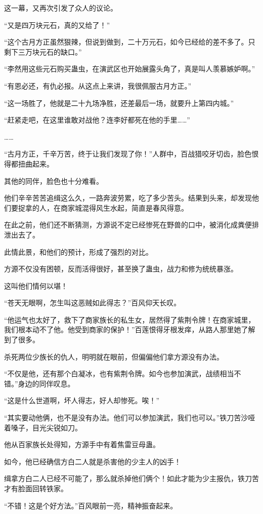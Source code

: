\begin{this_body}
这一幕，又再次引发了众人的议论。

“又是四万块元石，真的又给了！”

“这个古月方正虽然狠辣，但说到做到，二十万元石，如今已经给的差不多了。只剩下三万块元石的缺口。”

“李然用这些元石购买蛊虫，在演武区也开始展露头角了，真是叫人羡慕嫉妒啊。”

“有恩必还，有仇必报。从这点上来讲，我很佩服古月方正。”

“这一场胜了，他就是二十九场净胜，还差最后一场，就要升上第四内城。”

“赶紧走吧，在这里谁敢对战他？连李好都死在他的手里……”

……

“古月方正，千辛万苦，终于让我们发现了你！”人群中，百战猎咬牙切齿，脸色恨得都扭曲起来。

其他的同伴，脸色也十分难看。

他们辛辛苦苦追缉这么久，一路奔波劳累，吃了多少苦头。结果到头来，却发现他们要捉拿的人，在商家城混得风生水起，简直是春风得意。

在此之前，他们还不断猜测，方源说不定已经惨死在野兽的口中，被消化成粪便排泄出去了。

此情此景，和他们的预计，形成了强烈的对比。

方源不仅没有困顿，反而活得很好，甚至换了蛊虫，战力和修为统统暴涨。

这叫他们情何以堪！

“苍天无眼啊，怎生叫这恶贼如此得志？”百风仰天长叹。

“他运气也太好了，救下了商家族长的私生女，居然得了紫荆令牌！在商家城里，我们根本动不了他。他受到商家的保护！”百莲恨得牙根发痒，从路人那里她了解到了很多。

杀死两位少族长的仇人，明明就在眼前，但偏偏他们拿方源没有办法。

“不仅是他，还有那个白凝冰，也有紫荆令牌。如今也参加演武，战绩相当不错。”身边的同伴叹息。

“这是什么世道啊，坏人得志，好人却惨死。唉！”

“其实要动他俩，也不是没有办法。他们可以参加演武，我们也可以。”铁刀苦沙哑着嗓子，目光尖锐如刀。

他从百家族长处得知，方源手中有着焦雷豆母蛊。

如今，他已经确信方白二人就是杀害他的少主人的凶手！

缉拿方白二人已经不可能了，那么就杀掉他们俩个！如此才能为少主报仇，铁刀苦才有脸面回转铁家。

“不错！这是个好方法。”百风眼前一亮，精神振奋起来。


\end{this_body}
